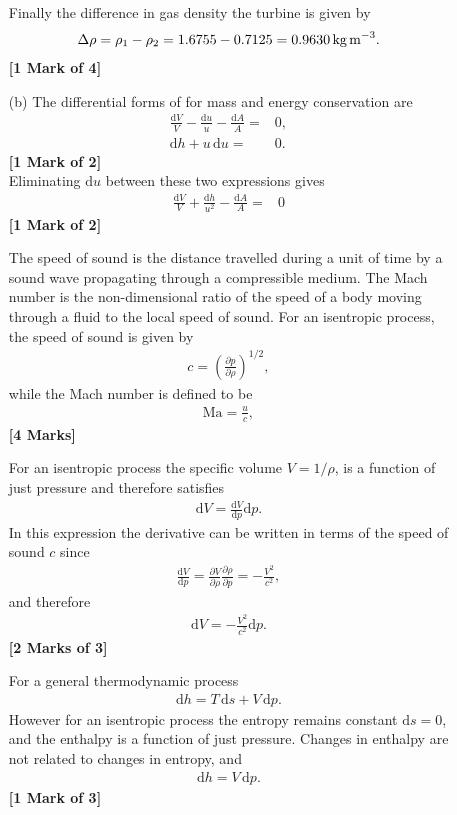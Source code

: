 \documentclass[12pt,twoside]{report}
\renewcommand{\d}{\mathrm{d}}
\newcommand{\fracp}[2]{\frac{\partial #1}{\partial #2}}
\newcommand{\fracd}[2]{\frac{\mathrm{d} #1}{\mathrm{d} #2}}
\renewcommand{\d}[1]{\mathrm{d} #1}
\newcommand{\Ma}{\mathrm{M\! a}}
\begin{document}
\begin{description}
\begin{itemize}
Finally the difference in gas density the turbine is given by
\begin{align*}
 \Delta \rho = \rho_1 - \rho_2 = 1.6755 - 0.7125 = 0.9630 \,\mbox{kg\,m}^{-3}.
\end{align*} \hfill \textbf{[1 Mark of 4]}

\item[(b)] The differential forms of for mass and energy conservation are
\begin{align*}
 \frac{\d{V}}{V} - \frac{\d{u}}{u} - \frac{\d{A}}{A} =& 0, \\
 \d{h} + u \, \d{u} =& 0.
\end{align*} \hfill \textbf{[1 Mark of 2]} \\
Eliminating $\d{u}$ between these two expressions gives
\begin{align*}
 \frac{\d{V}}{V} + \frac{\d{h}}{u^2} - \frac{\d{A}}{A} =& 0
\end{align*} \hfill \textbf{[1 Mark of 2]}

The speed of sound is the distance travelled during a unit of time by a sound wave propagating through a compressible medium. The Mach number is the non-dimensional ratio of the speed of a body moving through a fluid to the local speed of sound. For an isentropic process, the speed of sound is given by
\begin{align*}
 c = \left(\fracp{p}{\rho}\right)^{1/2},
\end{align*}
while the Mach number is defined to be
\begin{align*}
 \Ma = \frac{u}{c},
\end{align*} \hfill \textbf{[4 Marks]}

For an isentropic process the specific volume $V = 1/\rho$, is a function of just pressure and therefore satisfies
\begin{align*}
 \d{V} = \fracd{V}{p} \d{p}.
\end{align*}
In this expression the derivative can be written in terms of the speed of sound $c$ since
\begin{align*}
 \fracd{V}{p} = \fracp{V}{\rho} \fracp{\rho}{p} = -\frac{V^2}{c^2},
\end{align*}
and therefore
\begin{align*}
 \d{V} = -\frac{V^2}{c^2} \d{p}.
\end{align*} \hfill \textbf{[2 Marks of 3]}

For a general thermodynamic process
\begin{align*}
 \d{h} = T\,\d{s} + V \, \d{p}.
\end{align*}
However for an isentropic process the entropy remains constant $\d{s} = 0$, and the enthalpy is a function of just pressure. Changes in enthalpy are not related to changes in entropy, and
\begin{align*}
 \d{h} = V \, \d{p}.
\end{align*} \hfill \textbf{[1 Mark of 3]}


\end{itemize}
\end{description}
\end{document}
